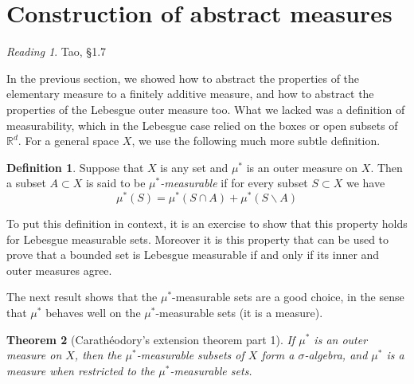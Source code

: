 \documentclass[11pt,oneside]{amsbook}
\renewcommand{\setminus}{\smallsetminus}
\newcommand{\RR}{{\mathbb R}}
\theoremstyle{definition}
\theoremstyle{plain}
\newtheorem{thm}{Theorem}[section]
\theoremstyle{definition}
\newtheorem{defn}[thm]{Definition}
\theoremstyle{remark}
\newtheorem*{reading}{Reading}
\numberwithin{equation}{section}
\numberwithin{figure}{section}
\begin{document}
\newpage
\section{Construction of abstract measures}

\begin{reading}
  Tao, \S 1.7
\end{reading}

In the previous section, we showed how to abstract the properties of the elementary measure to a finitely additive measure, and how to abstract the properties of the Lebesgue outer measure too. What we lacked was a definition of measurability, which in the Lebesgue case relied on the boxes or open subsets of $\RR^d$. For a general space $X$, we use the following much more subtle definition.

\begin{defn}
  Suppose that $X$ is any set and $\mu^*$ is an outer measure on $X$. Then a subset $A\subset X$ is said to be \emph{$\mu^*$-measurable} if for every subset $S\subset X$ we have
  \[\mu^*(S)=\mu^*(S\cap A)+\mu^*(S\setminus A)
  \]
\end{defn}

To put this definition in context, it is an exercise to show that this property holds for Lebesgue measurable sets. Moreover it is this property that can be used to prove that a bounded set is Lebesgue measurable if and only if its inner and outer measures agree.

The next result shows that the $\mu^*$-measurable sets are a good choice, in the sense that $\mu^*$ behaves well on the $\mu^*$-measurable sets (it is a measure).

\begin{thm}[Carath\'eodory's extension theorem part 1]
  If $\mu^*$ is an outer measure on $X$, then the $\mu^*$-measurable subsets of $X$ form a $\sigma$-algebra, and $\mu^*$ is a measure when restricted to the $\mu^*$-measurable sets.
\end{thm}
\end{document}
